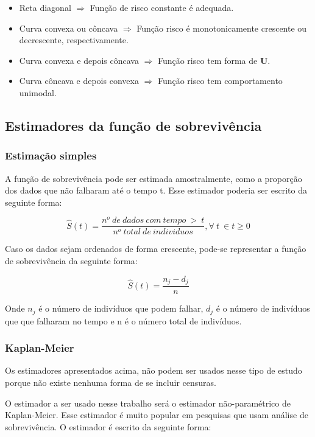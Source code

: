 \documentclass[
	article,
	12pt,				%
	openright,			%
	twoside,			%
	a4paper,			%
	english,			%
	french,				%
	spanish,			%
	brazil				%
	]{abntex2}
\begin{document}
\begin{itemize}
	\item Reta diagonal $\Rightarrow$ Função de risco constante é adequada.
	\item Curva convexa ou côncava $\Rightarrow$ Função
risco é monotonicamente crescente ou decrescente, respectivamente.
	\item Curva convexa e depois côncava $\Rightarrow$ Função risco tem forma de \textbf{U}.
	\item Curva côncava e depois convexa $\Rightarrow$ Função risco tem comportamento unimodal.
\end{itemize}

\subsection{Estimadores da função de sobrevivência}

\subsubsection{Estimação simples}

A função de sobrevivência pode ser estimada amostralmente, como a proporção dos dados que não falharam até o tempo t. Esse estimador poderia ser escrito da seguinte forma:

$$ \hat{S}(t) = \dfrac{n^o \ de \ dados \ com \ tempo \ > \ t}{n^o \ total \ de \ individuos}, \forall \ t \ \in t\ge 0$$

Caso os dados sejam ordenados de forma crescente, pode-se representar a função de sobrevivência da seguinte forma:

$$ \hat{S}(t) = \dfrac{n_j - d_j}{n} $$

Onde $n_j$ é o número de indivíduos que podem falhar, $d_j$ é o número de indivíduos que que falharam no tempo e n é o número total de indivíduos.

\subsubsection{Kaplan-Meier}

Os estimadores apresentados acima, não podem ser usados nesse tipo de estudo porque não existe nenhuma forma de se incluir censuras.

O estimador a ser usado nesse trabalho será o estimador não-paramétrico de Kaplan-Meier. Esse estimador é muito popular em pesquisas que usam análise de sobrevivência. O estimador é escrito da seguinte forma:
\end{document}
